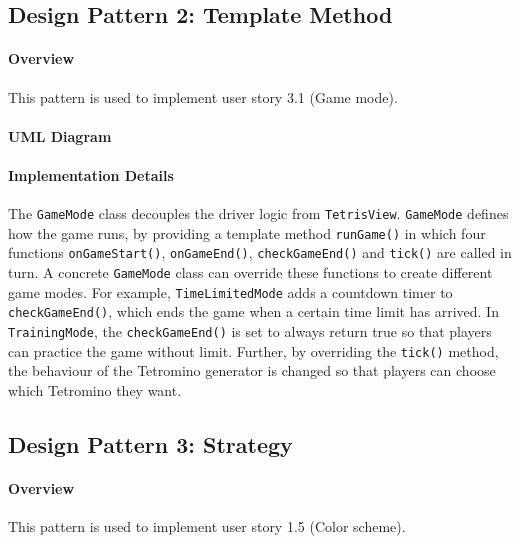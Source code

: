 \documentclass{article}
\begin{document}
\clearpage

\subsection{Design Pattern 2: Template Method}

\paragraph{Overview}
This pattern is used to implement user story 3.1 (Game mode).

\paragraph{UML Diagram}\hfill

\begin{figure}[H]
    
\end{figure}

\paragraph{Implementation Details}

The \verb`GameMode` class decouples the driver logic from \verb`TetrisView`. \verb`GameMode` defines how the game runs, by providing a template method \verb`runGame()` in which four functions \verb`onGameStart()`, \verb`onGameEnd()`, \verb`checkGameEnd()` and \verb`tick()` are called in turn. A concrete \verb`GameMode` class can override these functions to create different game modes. For example, \verb`TimeLimitedMode` adds a countdown timer to \verb`checkGameEnd()`, which ends the game when a certain time limit has arrived. In \verb`TrainingMode`, the \verb`checkGameEnd()` is set to always return true so that players can practice the game without limit. Further, by overriding the \verb`tick()` method, the behaviour of the Tetromino generator is changed so that players can choose which Tetromino they want.

\clearpage

\subsection{Design Pattern 3: Strategy}

\paragraph{Overview}
This pattern is used to implement user story 1.5 (Color scheme).
\end{document}

